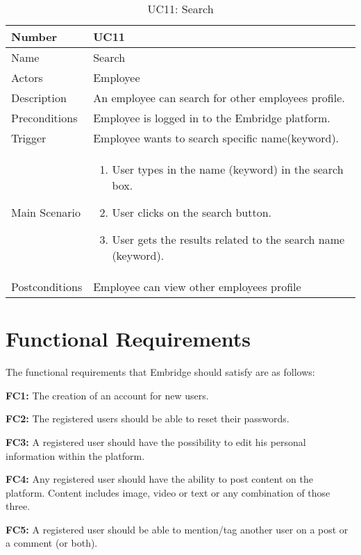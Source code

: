 \documentclass[12pt,a4paper]{article}
\begin{document}
\begin{table}[ht]

\caption{UC11: Search}
\label{tab:uc11}
\begin{tabularx}{\textwidth}{@{}lX@{}}
\toprule
Number & UC11 \\ \midrule
Name & Search \\
Actors & Employee\\
Description & An employee can search for other employees profile.
 \\
Preconditions & 
Employee is logged in to the Embridge platform.
 \\
 
Trigger & Employee wants to search specific name(keyword).\\

Main Scenario & 
\begin{enumerate}
\item User types in the name (keyword) in the search box.
\item User clicks on the search button.
\item User gets the results related to the search name (keyword).
\end{enumerate} \\
Postconditions & Employee can view other employees profile\\
\bottomrule
\end{tabularx}
\end{table}

\section{Functional Requirements}

The functional requirements that Embridge should satisfy are as follows:

\textbf{FC1:} The creation of an account for new users.

\textbf{FC2:} The registered users should be able to reset their passwords.

\textbf{FC3:} A registered user should have the possibility to edit his personal information within the platform.

\textbf{FC4:} Any registered user should have the ability to post content on the platform. Content includes image, video or text or any combination of those three.

\textbf{FC5:} A registered user should be able to mention/tag another user on a post or a comment (or both).
\end{document}
